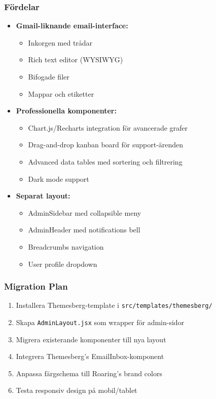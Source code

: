 \documentclass[12pt,a4paper]{article}
\begin{document}
\subsubsection{Fördelar}
\begin{itemize}
  \item \textbf{Gmail-liknande email-interface:}
  \begin{itemize}
    \item Inkorgen med trådar
    \item Rich text editor (WYSIWYG)
    \item Bifogade filer
    \item Mappar och etiketter
  \end{itemize}
  
  \item \textbf{Professionella komponenter:}
  \begin{itemize}
    \item Chart.js/Recharts integration för avancerade grafer
    \item Drag-and-drop kanban board för support-ärenden
    \item Advanced data tables med sortering och filtrering
    \item Dark mode support
  \end{itemize}
  
  \item \textbf{Separat layout:}
  \begin{itemize}
    \item AdminSidebar med collapsible meny
    \item AdminHeader med notifications bell
    \item Breadcrumbs navigation
    \item User profile dropdown
  \end{itemize}
\end{itemize}

\subsubsection{Migration Plan}
\begin{enumerate}
  \item Installera Themesberg-template i \texttt{src/templates/themesberg/}
  \item Skapa \texttt{AdminLayout.jsx} som wrapper för admin-sidor
  \item Migrera existerande komponenter till nya layout
  \item Integrera Themesberg's EmailInbox-komponent
  \item Anpassa färgschema till Roaring's brand colors
  \item Testa responsiv design på mobil/tablet
\end{enumerate}
\end{document}
